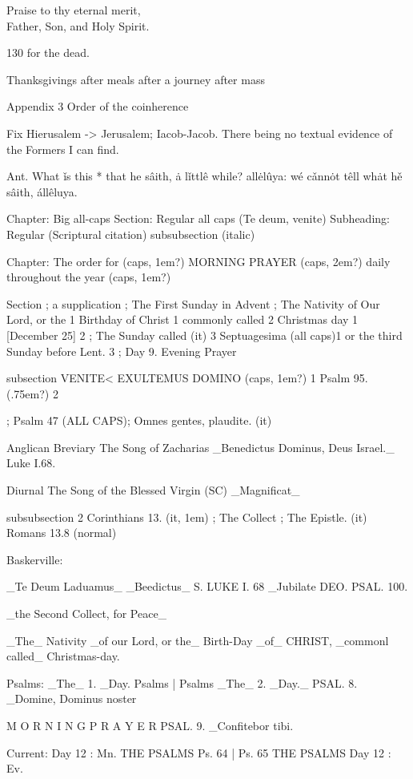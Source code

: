 Praise to thy eternal merit,\\
Father, Son, and Holy Spirit.



130 for the dead.


Thanksgivings
after meals
after a journey
after mass

Appendix 3
Order of the coinherence

Fix Hierusalem -> Jerusalem; Iacob-Jacob. There being no textual evidence of the Formers I can find.


Ant. What ǐs this * that he sâith, ȧ lǐttlê while? allėlûya: wé cǎnnȯt têll whȧt hě sâith, állêluya.



Chapter: Big all-caps
Section: Regular all caps (Te deum, venite)
Subheading: Regular (Scriptural citation)
subsubsection (italic)


Chapter:   
The order for (caps, 1em?)
MORNING PRAYER (caps, 2em?)
daily throughout the year (caps, 1em?)

Section
;
a supplication
;
The First Sunday in Advent
;
The Nativity of Our Lord, or the 1
Birthday of Christ 1 
commonly called 2
Christmas day 1
[December 25] 2
;
The Sunday called  (it) 3
Septuagesima (all caps)1
or the third Sunday before Lent. 3
;
Day 9. Evening Prayer

subsection
VENITE< EXULTEMUS DOMINO (caps, 1em?) 1
Psalm 95. (.75em?) 2

;
Psalm 47 (ALL CAPS); Omnes gentes, plaudite. (it)


Anglican Breviary
The Song of Zacharias
_Benedictus Dominus, Deus Israel._
Luke I.68.

Diurnal
The Song of the Blessed Virgin (SC)
_Magnificat_

subsubsection
2 Corinthians 13. (it, 1em)
; 
The Collect
;
The Epistle. (it) Romans 13.8 (normal)

Baskerville:



_Te Deum Laduamus_
_Beedictus_ S. LUKE I. 68
_Jubilate DEO. PSAL. 100.

_the Second Collect, for Peace_


_The_ Nativity _of our Lord, or the_ Birth-Day _of_ CHRIST, _commonl called_ Christmas-day.



Psalms:
_The_ 1. _Day.     Psalms   |     Psalms  _The_ 2. _Day._
PSAL. 8. _Domine, Dominus noster

M O R N I N G  P R A Y E R
PSAL. 9. _Confitebor tibi.

Current:
Day 12 : Mn.   THE PSALMS   Ps. 64 | Ps. 65  THE PSALMS  Day 12 : Ev.

